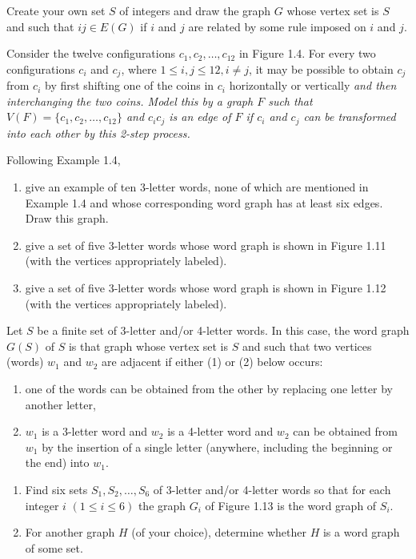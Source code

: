 \begin{exer}
Create your own set $S$ of integers and draw the graph $G$ whose vertex set is $S$ and such that $ij \in E(G)$ if $i$ and $j$ are related by some rule imposed on $i$ and $j$.
\end{exer}

\begin{exer}
Consider the twelve configurations $c_{1},c_{2},\ldots,c_{12}$ in Figure 1.4. For every two configurations $c_{i}$ and $c_{j}$, where $1 \leq i,j \leq 12, i \neq j$, it may be possible to obtain $c_{j}$ from $c_{i}$ by first shifting one of the coins in $c_{i}$ horizontally or vertically \it{and} then interchanging the two coins. Model this by a graph $F$ such that $V(F) = \{c_{1},c_{2},\ldots,c_{12}\}$ and $c_{i}c_{j}$ is an edge of $F$ if $c_{i}$ and $c_{j}$ can be transformed into each other by this 2-step process.
\end{exer}

\begin{exer}
Following Example 1.4,
\begin{enumerate}[{(a)}]
\item give an example of ten 3-letter words, none of which are mentioned in Example 1.4 and whose corresponding word graph has at least six edges. Draw this graph.
\item give a set of five 3-letter words whose word graph is shown in Figure 1.11 (with the vertices appropriately labeled).

\item give a set of five 3-letter words whose word graph is shown in Figure 1.12 (with the vertices appropriately labeled).

\end{enumerate}
\end{exer}

\begin{exer}
Let $S$ be a finite set of 3-letter and/or 4-letter words. In this case, the word graph $G(S)$ of $S$ is that graph whose vertex set is $S$ and such that two vertices (words) $w_{1}$ and $w_{2}$ are adjacent if either (1) or (2) below occurs:
\begin{enumerate}[{(1)}]
\item one of the words can be obtained from the other by replacing one letter by another letter,
\item $w_{1}$ is a 3-letter word and $w_{2}$ is a 4-letter word and $w_{2}$ can be obtained from $w_{1}$ by the insertion of a single letter (anywhere, including the beginning or the end) into $w_{1}$.
\end{enumerate}
\begin{enumerate}[{(a)}]
\item Find six sets $S_{1},S_{2},\ldots,S_{6}$ of 3-letter and/or 4-letter words so that for each integer $i$ $(1 \leq i \leq 6)$ the graph $G_{i}$ of Figure 1.13 is the word graph of $S_{i}$.
\item For another graph $H$ (of your choice), determine whether $H$ is a word graph of some set.
\end{enumerate}


\end{exer}

